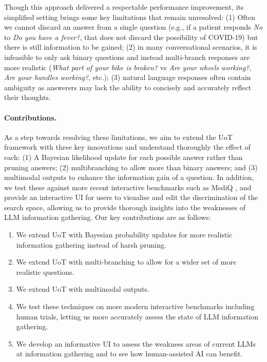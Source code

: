 \documentclass{article} %
\begin{document}
Though this approach delivered a respectable performance improvement, its simplified setting brings some key limitations that remain unresolved: (1) Often we cannot discard an answer from a single question (e.g., if a patient responds \emph{No} to \emph{Do you have a fever?}, that does not discard the possibility of COVID-19) but there is still information to be gained; (2) in many conversational scenarios, it is infeasible to only ask binary questions and instead multi-branch responses are more realistic (\emph{What part of your bike is broken?} vs \emph{Are your wheels working?}, \emph{Are your handles working?}, etc.); (3) natural language responses often contain ambiguity as answerers may lack the ability to concisely and accurately reflect their thoughts.

\paragraph{Contributions.}
As a step towards resolving these limitations, we aim to extend the UoT framework with three key innovations and understand thoroughly the effect of each: (1) A Bayesian likelihood update for each possible answer rather than pruning answers; (2) multibranching to allow more than binary answers; and (3) multimodal outputs to enhance the information gain of a question. In addition, we test these against more recent interactive benchmarks such as MediQ \cite{mediq}, and provide an interactive UI for users to visualise and edit the discrimination of the search space, allowing us to provide thorough insights into the weaknesses of LLM information gathering. Our key contributions are as follows:
\begin{enumerate}
    \item We extend UoT with Bayesian probability updates for more realistic information gathering instead of harsh pruning.
    \item We extend UoT with multi-branching to allow for a wider set of more realistic questions.
    \item We extend UoT with multimodal outputs.
    \item We test these techniques on more modern interactive benchmarks including human trials, letting us more accurately assess the state of LLM information gathering.
    \item We develop an informative UI to assess the weakness areas of current LLMs at information gathering and to see how human-assisted AI can benefit.
\end{enumerate}
\end{document}
